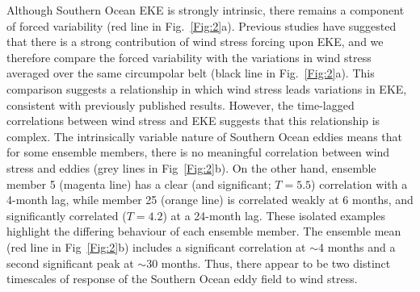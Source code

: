 \documentclass{agujournal2019}
\begin{document}
Although Southern Ocean EKE is strongly intrinsic, there remains a component of forced variability (red line in Fig.~\ref{Fig:2}a).
Previous studies have suggested that there is a strong contribution of wind stress forcing upon EKE, and we therefore compare the forced variability with the variations in wind stress averaged over the same circumpolar belt (black line in Fig.~\ref{Fig:2}a).
This comparison suggests a relationship in which wind stress leads variations in EKE, consistent with previously published results.
However, the time-lagged correlations between wind stress and EKE suggests that this relationship is complex. 
The intrinsically variable nature of Southern Ocean eddies means that for some ensemble members, there is no meaningful correlation between wind stress and eddies (grey lines in Fig~\ref{Fig:2}b).
On the other hand, ensemble member 5 (magenta line) has a clear (and significant; $T = 5.5$) correlation with a 4-month lag, while member 25 (orange line) is correlated weakly at 6 months, and significantly correlated ($T = 4.2$) at a 24-month lag.
These isolated examples highlight the differing behaviour of each ensemble member. 
The ensemble mean (red line in Fig~\ref{Fig:2}b) includes a significant correlation at $\sim$4 months and a second significant peak at $\sim$30 months.
Thus, there appear to be two distinct timescales of response of the Southern Ocean eddy field to wind stress. 
\end{document}
